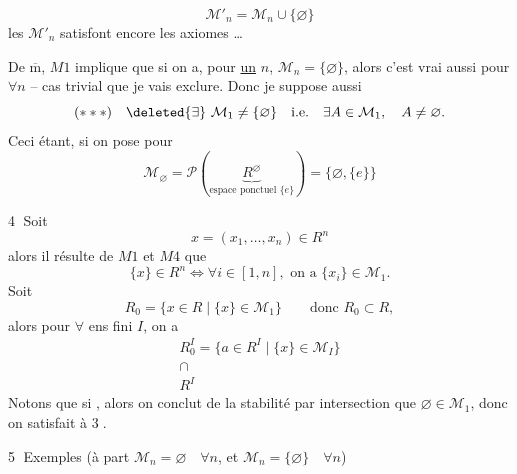 \[
\mathcal M'_n=\mathcal M_n\cup\{\varnothing\}
\]
les $\mathcal M'_n$ satisfont encore les axiomes \ldots


De $\overline{\mathrm m}$,  $M1$ implique que si on a, pour \uline{un} $n$,  $\mathcal M_n=\{\varnothing\}$, alors c'est vrai aussi pour $\forall n$ -- cas trivial  que je vais exclure. Donc je suppose aussi
\[
(***)\quad\deleted{\exists}\ \mathcal M_1\ne\{\varnothing\}\quad\text{i.e.}\quad\exists A\in\mathcal M_1,\quad A\ne\varnothing.
\]
Ceci étant, si on pose pour 
\[
\mathcal M_\varnothing=\mathcal P(\underbrace{R^\varnothing}_{\text{espace ponctuel }\{e\}})=\{\varnothing,\{e\}\}
\]

\textcircled{4} Soit 
\[
x=(x_1,\ldots,x_n)\in R^n
\]
alors il résulte de $M1$ et $M4$ que
\[
\{x\}\in R^n\Longleftrightarrow\forall i\in[1,n],\text{ on a }\{x_i\}\in\mathcal M_1.
\]
Soit
\[
R_0=\{x\in R\mid\{x\}\in\mathcal M_1\}\qquad\text{donc }R_0\subset R,
\]
alors pour $\forall$ ens fini $I$, on a
\[
\begin{array}{l}
R_0^I=\{a\in R^I\mid\{x\}\in\mathcal M_I\}\\
\cap\\
R^I
\end{array}
\]
Notons que si  , alors on conclut de la stabilité  par intersection que $\varnothing\in\mathcal M_1$, donc on satisfait à \textcircled{3}.

\textcircled{5} Exemples (à part $\mathcal M_n=\varnothing\quad\forall n$, et $\mathcal M_n=\{\varnothing\}\quad\forall n$)
